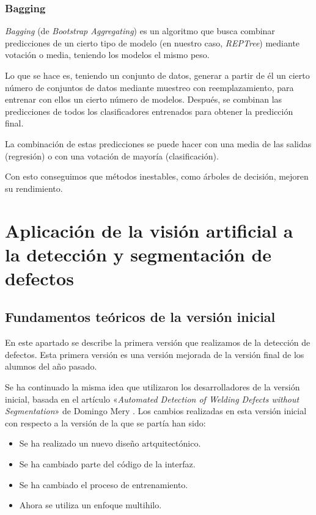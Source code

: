 \subsubsection{Bagging}
\textit{Bagging} (de \textit{Bootstrap Aggregating})\cite{juan_jose_rodriguez_diez_apuntes_2012} es un algoritmo que busca combinar predicciones de un cierto tipo de modelo (en nuestro caso, \textit{REPTree}) mediante votación o media, teniendo los modelos el mismo peso.

Lo que se hace es, teniendo un conjunto de datos, generar a partir de él un cierto número de conjuntos de datos mediante muestreo con reemplazamiento, para entrenar con ellos un cierto número de modelos. Después, se combinan las predicciones de todos los clasificadores entrenados para obtener la predicción final.

La combinación de estas predicciones se puede hacer con una media de las salidas (regresión) o con una votación de mayoría (clasificación).

Con esto conseguimos que métodos inestables, como árboles de decisión, mejoren su rendimiento.



\section{Aplicación de la visión artificial a la detección y segmentación de defectos}\label{aplicacion}


\subsection{Fundamentos teóricos de la versión inicial}
En este apartado se describe la primera versión que realizamos de la detección de defectos. Esta primera versión es una versión mejorada de la versión final de los alumnos del año pasado.

Se ha continuado la misma idea que utilizaron los desarrolladores de la versión inicial, basada en el artículo «\emph{Automated Detection of Welding Defects without Segmentation}» de Domingo Mery \cite{DomingoMery}. Los cambios realizadas en esta versión inicial con respecto a la versión de la que se partía han sido:
\begin{itemize}
\item Se ha realizado un nuevo diseño artquitectónico.
\item Se ha cambiado parte del código de la interfaz.
\item Se ha cambiado el proceso de entrenamiento.
\item Ahora se utiliza un enfoque multihilo.
\end{itemize}

